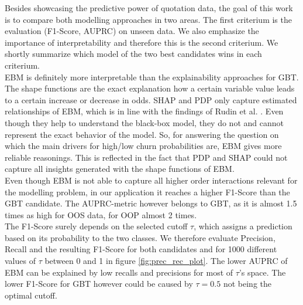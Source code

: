 \documentclass[12pt,titlepage]{article}
\begin{document}
Besides showcasing the predictive power of quotation data, the goal of this work is to compare both modelling approaches in two areas. The first criterium is the evaluation (F1-Score, AUPRC) on unseen data. We also emphasize the importance of interpretability and therefore this is the second criterium. We shortly summarize which model of the two best candidates wins in each criterium. \\
EBM is definitely more interpretable than the explainability approaches for GBT. The shape functions are the exact explanation how a certain variable value leads to a certain increase or decrease in odds. SHAP and PDP only capture estimated relationships of EBM, which is in line with the findings of Rudin et al. \cite{rudin}. Even though they help to understand the black-box model, they do not and cannot represent the exact behavior of the model. So, for answering the question on which the main drivers for high/low churn probabilities are, EBM gives more reliable reasonings. This is reflected in the fact that PDP and SHAP could not capture all insights generated with the shape functions of EBM. \\
Even though EBM is not able to capture all higher order interactions relevant for the modelling problem, in our application it reaches a higher F1-Score than the GBT candidate. The AUPRC-metric however belongs to GBT, as it is almost 1.5 times as high for OOS data, for OOP almost 2 times. \\
The F1-Score surely depends on the selected cutoff $\tau$, which assigns a prediction based on its probability to the two classes. We therefore evaluate Precision, Recall and the resulting F1-Score for both candidates and for 1000 different values of $\tau$ between 0 and 1 in figure \ref{fig:prec_rec_plot}. The lower AUPRC of EBM can be explained by low recalls and precisions for most of $\tau$'s space. The lower F1-Score for GBT however could be caused by $\tau=0.5$ not being the optimal cutoff.
\end{document}
